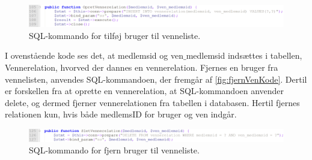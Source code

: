 \begin{figure} [H]
\centering
\includegraphics[width=1\textwidth]{figures/imple/opretVenKode}
\caption{SQL-kommando for tilføj bruger til venneliste.}
\label{fig:opretVenKode}
\end{figure}

\noindent
I ovenstående kode ses det, at medlemsid og ven$\_$medlemsid indsættes i tabellen, Vennerelation, hvorved der dannes en vennerelation. Fjernes en bruger fra vennelisten, anvendes SQL-kommandoen, der fremgår af \autoref{fig:fjernVenKode}. Dertil er forskellen fra at oprette en vennerelation, at SQL-kommandoen anvender delete, og dermed fjerner vennerelationen fra tabellen i databasen. Hertil fjernes relationen kun, hvis både medlemsID for bruger og ven indgår. 

\begin{figure} [H]
\centering
\includegraphics[width=1\textwidth]{figures/imple/fjernVenKode}
\caption{SQL-kommando for fjern bruger til venneliste.}
\label{fig:fjernVenKode}
\end{figure}

